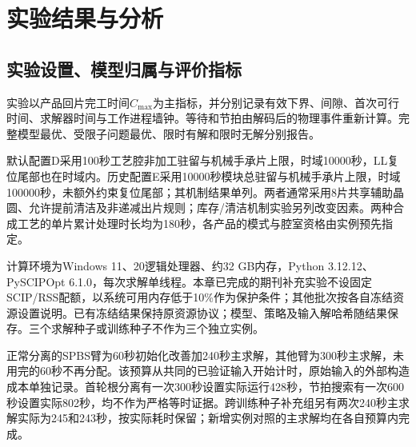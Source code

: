 \chapter{实验结果与分析}\label{sec:experiments-cn}
\section{实验设置、模型归属与评价指标}\label{sec:experiment-settings-cn}
实验以产品回片完工时间$C_{\max}$为主指标，并分别记录有效下界、间隙、首次可行时间、求解器时间与工作进程墙钟。等待和节拍由解码后的物理事件重新计算。完整模型最优、受限子问题最优、限时有解和限时无解分别报告。

默认配置D采用100秒工艺腔非加工驻留与机械手承片上限，时域10000秒，LL复位尾部也在时域内。历史配置E采用10000秒模块总驻留与机械手承片上限，时域100000秒，未额外约束复位尾部；其机制结果单列。两者通常采用8片共享辅助晶圆、允许提前清洁及非递减出片规则；库存/清洁机制实验另列改变因素。两种合成工艺的单片累计处理时长均为180秒，各产品的模式与腔室资格由实例预先指定。

计算环境为Windows 11、20逻辑处理器、约32 GB内存，Python 3.12.12、PySCIPOpt 6.1.0，每次求解单线程。本章已完成的期刊补充实验不设固定SCIP/RSS配额，以系统可用内存低于10\%作为保护条件；其他批次按各自冻结资源设置说明。已有冻结结果保持原资源协议；模型、策略及输入解哈希随结果保存。三个求解种子或训练种子不作为三个独立实例。

正常分离的SPBS臂为60秒初始化改善加240秒主求解，其他臂为300秒主求解，未用完的60秒不再分配。该预算从共同的已验证输入开始计时，原始输入的外部构造成本单独记录。首轮根分离有一次300秒设置实际运行428秒，节拍搜索有一次600秒设置实际802秒，均不作为严格等时证据。跨训练种子补充组另有两次240秒主求解实际为245和243秒，按实际耗时保留；新增实例对照的主求解均在各自预算内完成。
